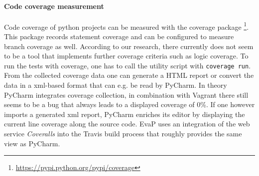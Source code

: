 \paragraph{Code coverage measurement}
Code coverage of python projects can be measured with the coverage package%
\footnote{\url{https://pypi.python.org/pypi/coverage}}.
This package records statement coverage and can be configured to measure branch coverage as well.
According to our research, there currently does not seem to be a tool that implements further coverage criteria such as logic coverage.
To run the tests with coverage, one has to call the utility script with \texttt{coverage run}.
From the collected coverage data one can generate a HTML report or convert the data in a xml-based format that can e.g. be read by PyCharm.
In theory PyCharm integrates coverage collection, in combination with Vagrant there still seems to be a bug that always leads to a displayed coverage of 0\%.
If one however imports a generated xml report, PyCharm enriches its editor by displaying the current line coverage along the source code.
EvaP uses an integration of the web service \textit{Coveralls} into the Travis build process that roughly provides the same view as PyCharm.
